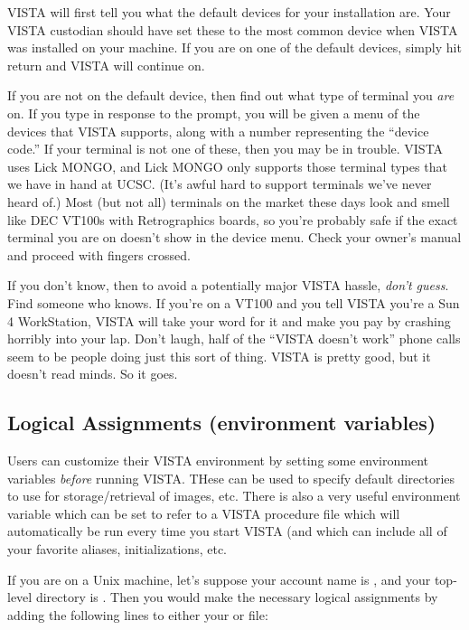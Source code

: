 VISTA will first tell you what the default devices for your installation are.
Your VISTA custodian should have set these to the most common device when
VISTA was installed on your machine.  If you are on one of the default
devices, simply hit return and VISTA will continue on.

If you are not on the default device, then find out what type of terminal you
{\it are} on.  If you type  in response to the 
prompt, you will be given a menu of the devices that VISTA supports, along
with a number representing the ``device code.'' If your terminal is not one of
these, then you may be in trouble.  VISTA uses Lick MONGO, and Lick MONGO only
supports those terminal types that we have in hand at UCSC.  (It's awful hard
to support terminals we've never heard of.)  Most (but not all) terminals on
the market these days look and smell like DEC VT100s with Retrographics
boards, so you're probably safe if the exact terminal you are on doesn't show
in the device menu.  Check your owner's manual and proceed with fingers
crossed.

If you don't know, then to avoid a potentially major VISTA hassle, {\it don't
guess}.  Find someone who knows.  If you're on a VT100 and you tell VISTA
you're a Sun 4 WorkStation, VISTA will take your word for it and make you pay
by crashing horribly into your lap.  Don't laugh, half of the ``VISTA doesn't
work'' phone calls seem to be people doing just this sort of thing. VISTA is
pretty good, but it doesn't read minds.  So it goes.

\subsection{Logical Assignments (environment variables)}

Users can customize their VISTA environment by setting  some environment
variables {\it before} running VISTA. THese can be used to specify
default directories to use for storage/retrieval of images, etc. There
is also a very useful environment variable which can be set to refer to
a VISTA procedure file which will automatically be run every time  you
start VISTA (and which can include all of your favorite aliases, 
initializations, etc.

If you are on a Unix machine, let's suppose your account name is ,
and your top-level directory is .  Then you would make the
necessary logical assignments by adding the following lines to either your
 or  file:

